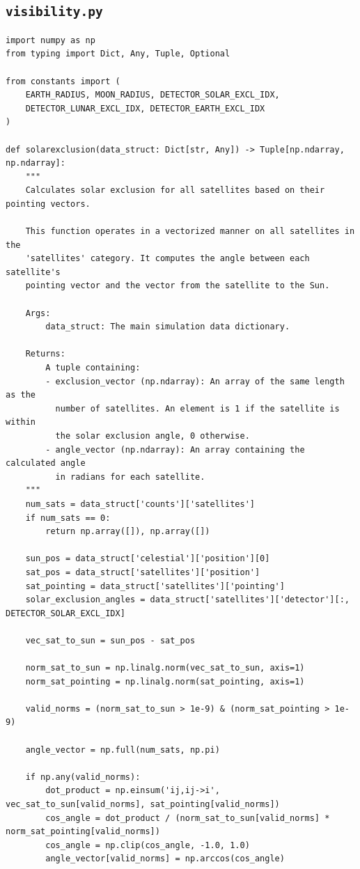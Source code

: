 \documentclass[11pt]{article}
\begin{document}
\subsection{\texttt{visibility.py}}
\begin{Verbatim}
import numpy as np
from typing import Dict, Any, Tuple, Optional

from constants import (
    EARTH_RADIUS, MOON_RADIUS, DETECTOR_SOLAR_EXCL_IDX,
    DETECTOR_LUNAR_EXCL_IDX, DETECTOR_EARTH_EXCL_IDX
)

def solarexclusion(data_struct: Dict[str, Any]) -> Tuple[np.ndarray, np.ndarray]:
    """
    Calculates solar exclusion for all satellites based on their pointing vectors.

    This function operates in a vectorized manner on all satellites in the
    'satellites' category. It computes the angle between each satellite's
    pointing vector and the vector from the satellite to the Sun.

    Args:
        data_struct: The main simulation data dictionary.

    Returns:
        A tuple containing:
        - exclusion_vector (np.ndarray): An array of the same length as the
          number of satellites. An element is 1 if the satellite is within
          the solar exclusion angle, 0 otherwise.
        - angle_vector (np.ndarray): An array containing the calculated angle
          in radians for each satellite.
    """
    num_sats = data_struct['counts']['satellites']
    if num_sats == 0:
        return np.array([]), np.array([])

    sun_pos = data_struct['celestial']['position'][0]
    sat_pos = data_struct['satellites']['position']
    sat_pointing = data_struct['satellites']['pointing']
    solar_exclusion_angles = data_struct['satellites']['detector'][:, DETECTOR_SOLAR_EXCL_IDX]

    vec_sat_to_sun = sun_pos - sat_pos

    norm_sat_to_sun = np.linalg.norm(vec_sat_to_sun, axis=1)
    norm_sat_pointing = np.linalg.norm(sat_pointing, axis=1)

    valid_norms = (norm_sat_to_sun > 1e-9) & (norm_sat_pointing > 1e-9)

    angle_vector = np.full(num_sats, np.pi)

    if np.any(valid_norms):
        dot_product = np.einsum('ij,ij->i', vec_sat_to_sun[valid_norms], sat_pointing[valid_norms])
        cos_angle = dot_product / (norm_sat_to_sun[valid_norms] * norm_sat_pointing[valid_norms])
        cos_angle = np.clip(cos_angle, -1.0, 1.0)
        angle_vector[valid_norms] = np.arccos(cos_angle)


\end{Verbatim}
\end{document}
